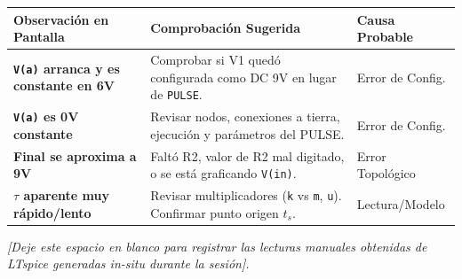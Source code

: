 \documentclass[11pt, a4paper]{article}
\begin{document}
\renewcommand{\arraystretch}{1.5}
\noindent
\begin{tabularx}{\textwidth}{>{\bfseries\RaggedRight}p{4cm} >{\RaggedRight\arraybackslash}X >{\RaggedRight\arraybackslash}p{3cm}}
\toprule
\textbf{Observación en Pantalla} & \textbf{Comprobación Sugerida} & \textbf{Causa Probable} \\ 
\midrule
\texttt{V(a)} arranca y es constante en 6V & Comprobar si V1 quedó configurada como DC 9V en lugar de \texttt{PULSE}. & Error de Config. \\ \addlinespace
\texttt{V(a)} es 0V constante & Revisar nodos, conexiones a tierra, ejecución y parámetros del PULSE. & Error de Config. \\ \addlinespace
Final se aproxima a 9V & Faltó R2, valor de R2 mal digitado, o se está graficando \texttt{V(in)}. & Error Topológico \\ \addlinespace
$\tau$ aparente muy rápido/lento & Revisar multiplicadores (\texttt{k} vs \texttt{m}, \texttt{u}). Confirmar punto origen $t_s$. & Lectura/Modelo \\
\bottomrule
\end{tabularx}

\vspace{0.8cm}
\begin{tcolorbox}[colback=white, colframe=black, title=\textbf{Espacio para Inserción de Lecturas Reales}]
\textit{[Deje este espacio en blanco para registrar las lecturas manuales obtenidas de LTspice generadas in-situ durante la sesión].}
\vspace{3cm}
\end{tcolorbox}
\end{document}
